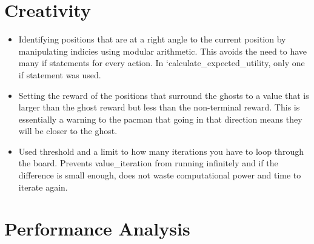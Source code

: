 \documentclass[12pt]{report}
\begin{document}
      \section*{Creativity}
        \begin{itemize}
          \item Identifying positions that are at a right angle to the current position by manipulating indicies using modular arithmetic. This avoids the need to have many if statements for every action. In `calculate\_expected\_utility, only one if statement was used.
          \item Setting the reward of the positions that surround the ghosts to a value that is larger than the ghost reward but less than the non-terminal reward. This is essentially a warning to the pacman that going in that direction means they will be closer to the ghost.
          \item Used threshold and a limit to how many iterations you have to loop through the board. Prevents value\_iteration from running infinitely and if the difference is small enough, does not waste computational power and time to iterate again.
        \end{itemize}


      \section*{Performance Analysis}
\end{document}
